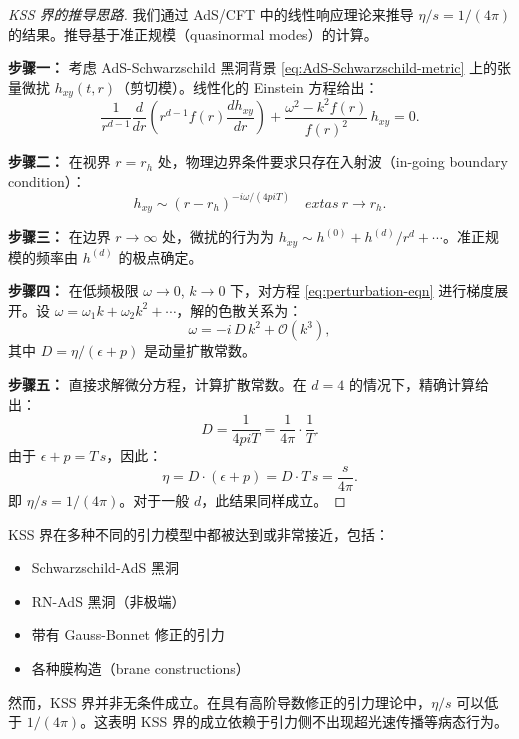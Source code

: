 \begin{proof}[KSS 界的推导思路]
我们通过 AdS/CFT 中的线性响应理论来推导 $\eta/s = 1/(4\pi)$ 的结果。推导基于准正规模（quasinormal modes）的计算。

\textbf{步骤一：} 考虑 AdS-Schwarzschild 黑洞背景 \eqref{eq:AdS-Schwarzschild-metric} 上的张量微扰 $h_{xy}(t, r)$（剪切模）。线性化的 Einstein 方程给出：
\begin{equation}\label{eq:perturbation-eqn}
    \frac{1}{r^{d-1}}\frac{d}{dr}\left(r^{d-1}f(r)\frac{dh_{xy}}{dr}\right) + \frac{\omega^2 - k^2 f(r)}{f(r)^2}\,h_{xy} = 0.
\end{equation}

\textbf{步骤二：} 在视界 $r = r_h$ 处，物理边界条件要求只存在入射波（in-going boundary condition）：
\begin{equation}
    h_{xy} \sim (r - r_h)^{-i\omega/(4pi T)} \quad ext{as}\ r \to r_h.
\end{equation}

\textbf{步骤三：} 在边界 $r \to \infty$ 处，微扰的行为为 $h_{xy} \sim h^{(0)} + h^{(d)}/r^d + \cdots$。准正规模的频率由 $h^{(d)}$ 的极点确定。

\textbf{步骤四：} 在低频极限 $\omega \to 0$, $k \to 0$ 下，对方程 \eqref{eq:perturbation-eqn} 进行梯度展开。设 $\omega = \omega_1 k + \omega_2 k^2 + \cdots$，解的色散关系为：
\begin{equation}\label{eq:dispersion-shear}
    \omega = -i\,D\,k^2 + \mathcal{O}(k^3),
\end{equation}
其中 $D = \eta/(\epsilon + p)$ 是动量扩散常数。

\textbf{步骤五：} 直接求解微分方程，计算扩散常数。在 $d=4$ 的情况下，精确计算给出：
\begin{equation}
    D = \frac{1}{4pi T} = \frac{1}{4\pi}\cdot\frac{1}{T}.
\end{equation}
由于 $\epsilon + p = T\,s$，因此：
\begin{equation}
    \eta = D\cdot(\epsilon + p) = D\cdot T\,s = \frac{s}{4\pi}.
\end{equation}
即 $\eta/s = 1/(4\pi)$。对于一般 $d$，此结果同样成立。
\end{proof}

\begin{remark}
KSS 界在多种不同的引力模型中都被达到或非常接近，包括：
\begin{itemize}
    \item Schwarzschild-AdS 黑洞
    \item RN-AdS 黑洞（非极端）
    \item 带有 Gauss-Bonnet 修正的引力
    \item 各种膜构造（brane constructions）
\end{itemize}
然而，KSS 界并非无条件成立。在具有高阶导数修正的引力理论中，$\eta/s$ 可以低于 $1/(4\pi)$。这表明 KSS 界的成立依赖于引力侧不出现超光速传播等病态行为。
\end{remark}

